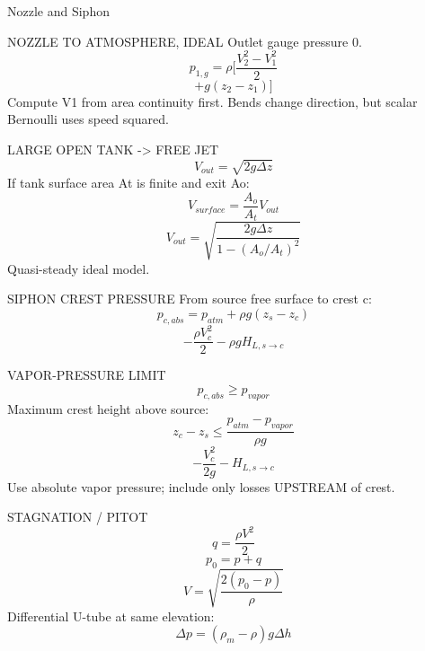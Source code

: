 Nozzle and Siphon

NOZZLE TO ATMOSPHERE, IDEAL
Outlet gauge pressure 0.
$$p_{1,g}=\rho[\frac{V_2^2-V_1^2}{2}$$
$$+g(z_2-z_1)]$$
Compute V1 from area continuity first.
Bends change direction, but scalar Bernoulli uses speed squared.

LARGE OPEN TANK -> FREE JET
$$V_{out}=\sqrt{2g\Delta z}$$
If tank surface area At is finite and exit Ao:
$$V_{surface}=\frac{A_o}{A_t}V_{out}$$
$$V_{out}=\sqrt{\frac{2g\Delta z}{1-(A_o/A_t)^2}}$$
Quasi-steady ideal model.

SIPHON CREST PRESSURE
From source free surface to crest c:
$$p_{c,abs}=p_{atm}+\rho g(z_s-z_c)$$
$$-\frac{\rho V_c^2}{2}-\rho gH_{L,s\to c}$$

VAPOR-PRESSURE LIMIT
$$p_{c,abs}\ge p_{vapor}$$
Maximum crest height above source:
$$z_c-z_s\le\frac{p_{atm}-p_{vapor}}{\rho g}$$
$$-\frac{V_c^2}{2g}-H_{L,s\to c}$$
Use absolute vapor pressure; include only losses UPSTREAM of crest.

STAGNATION / PITOT
$$q=\frac{\rho V^2}{2}$$
$$p_0=p+q$$
$$V=\sqrt{\frac{2(p_0-p)}{\rho}}$$
Differential U-tube at same elevation:
$$\Delta p=(\rho_m-\rho)g\Delta h$$
